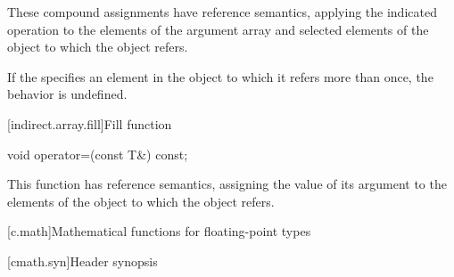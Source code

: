 \begin{itemdescr}
\pnum
These compound assignments have reference semantics, applying the indicated
operation to the elements of the argument array and selected elements of the
object to which the
object refers.

\pnum
If the
specifies an element in the
object to which it refers more than once,
the behavior is undefined.
\end{itemdescr}

[indirect.array.fill]{Fill function}

%
\begin{itemdecl}
void operator=(const T&) const;
\end{itemdecl}

\begin{itemdescr}
\pnum
This function has reference semantics, assigning the value of its argument
to the elements of the
object to which the
object refers.
\end{itemdescr}

[c.math]{Mathematical functions for floating-point types}

[cmath.syn]{Header  synopsis}

